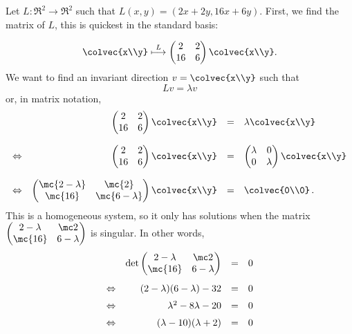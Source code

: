 
\begin{example}
Let $L \colon \Re^2\rightarrow \Re^2$ such that $L(x,y)=(2x+2y, 16x+6y)$.  First, we  find the matrix of $L$, this is quickest in the standard basis:

\[
\colvec{x\\y}\stackrel{L}{\longmapsto} \begin{pmatrix}
2 & 2 \\
16 & 6
\end{pmatrix}\colvec{x\\y}.
\]
We want to find an invariant direction $v=\colvec{x\\y}$ such that
\[
Lv=\lambda v
\]
or, in matrix notation,
\begin{equation*}
\begin{array}{lrcl}
&\begin{pmatrix}
2 & 2 \\
16 & 6
\end{pmatrix}\colvec{x\\y}&=&\lambda \colvec{x\\y} \\[6mm]
\Leftrightarrow &\begin{pmatrix}
2 & 2 \\
16 & 6
\end{pmatrix}\colvec{x\\y}&=&\begin{pmatrix}
\lambda & 0 \\
0 & \lambda
\end{pmatrix} \colvec{x\\y} \\[6mm] 
\Leftrightarrow& 
\begin{pmatrix}
\mc{2-\lambda} & \mc{2} \\
\mc{16} & \mc{6-\lambda}
\end{pmatrix}\colvec{x\\y}&=& \colvec{0\\0}\, .
\end{array}
\end{equation*}
This is a homogeneous system, so it only has solutions when the matrix $\begin{pmatrix}
2-\lambda & \mc2 \\
\mc{16} & 6-\lambda
\end{pmatrix}$ is singular.  In other words, 
\begin{equation*}
\begin{array}{lrcl}
&\det \begin{pmatrix}
2-\lambda & \mc2 \\
\mc{16} & 6-\lambda
\end{pmatrix}&=&0 \\[5mm]
\Leftrightarrow& (2-\lambda)(6-\lambda)-32&=&0 \\[2mm]
\Leftrightarrow &\lambda^2-8\lambda-20&=&0\\[2mm]
\Leftrightarrow &(\lambda-10)(\lambda+2)&=&0
\end{array}
\end{equation*}


\end{example}
